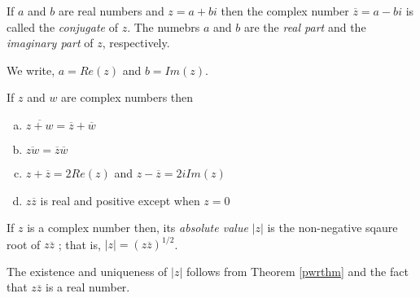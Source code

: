 \begin{defn}
	If $a$ and $b$ are real numbers and $z = a + bi$ then
	the complex number $\overline{z} = a - bi$ is called the {\it conjugate} of $z$.
	The numebrs $a$ and $b$ are the {\it real part} and the {\it imaginary part} of $z$, respectively.

	We write, $a = Re(z)$ and $b = Im(z)$.
\end{defn}

\begin{thm}
	If $z$ and $w$ are complex numbers then
	\begin{enumerate}[a)]
		\item $\overline{z+w} = \overline{z} + \overline{w}$
		\item $\overline{zw} = \overline{z} \overline{w}$
		\item $z + \overline{z} = 2Re(z)$ and $z - \overline{z} = 2 i Im(z)$
		\item $z\overline{z}$ is real and positive except when $z = 0$
	\end{enumerate}
\end{thm}

\begin{defn}
	If $z$ is a complex number then, its {\it absolute value} $|z|$ is the non-negative
	sqaure root of $z\overline{z}$ ; that is, $|z| = (z\overline{z})^{1/2}$.

	The existence and uniqueness of $|z|$ follows from Theorem \ref{pwrthm} and the fact that $z \overline{z}$ is a real number.
\end{defn}

